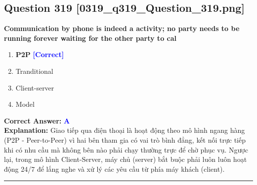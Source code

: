 \documentclass[11pt,a4paper]{article}
\begin{document}
\begin{minipage}{\textwidth}
\subsection*{Question 319 \quad \footnotesize{[0319\_q319\_Question\_319.png]}}
\noindent \textbf{Communication by phone is indeed a activity; no party needs to be running forever waiting for the other party to cal}

\begin{enumerate}[label=\Alph*.]
    \item \textbf{P2P} \hfill \textcolor{blue}{\textbf{[Correct]}}
    \item Tranditional
    \item Client-server
    \item Model
\end{enumerate}

\noindent \textbf{Correct Answer:} \textcolor{blue}{\textbf{A}} \\[2pt]
\noindent \textbf{Explanation:} Giao tiếp qua điện thoại là hoạt động theo mô hình ngang hàng (P2P - Peer-to-Peer) vì hai bên tham gia có vai trò bình đẳng, kết nối trực tiếp khi có nhu cầu mà không bên nào phải chạy thường trực để chờ phục vụ. Ngược lại, trong mô hình Client-Server, máy chủ (server) bắt buộc phải luôn luôn hoạt động 24/7 để lắng nghe và xử lý các yêu cầu từ phía máy khách (client).

\par\vspace{0.3cm}
\hrule
\vspace{0.3cm}
\end{minipage}
\end{document}
